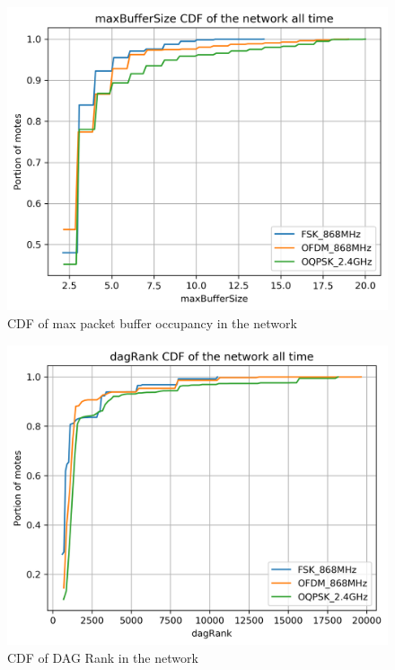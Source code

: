 \documentclass[journal]{IEEEtran}
\begin{document}
\begin{figure}
	\centering
	\includegraphics[width=0.90\columnwidth]{maxBufferSize_cdf_plot_full}
	\caption{CDF of max packet buffer occupancy in the network} 
    \label{fig:maxBufferSize_cdf_plot_full}
\end{figure}
\begin{figure}
	\centering
	\includegraphics[width=0.90\columnwidth]{dagRank_cdf_plot_full}
	\caption{CDF of DAG Rank in the network} 
    \label{fig:{dagRank_cdf_plot_full}}
\end{figure}
\end{document}
